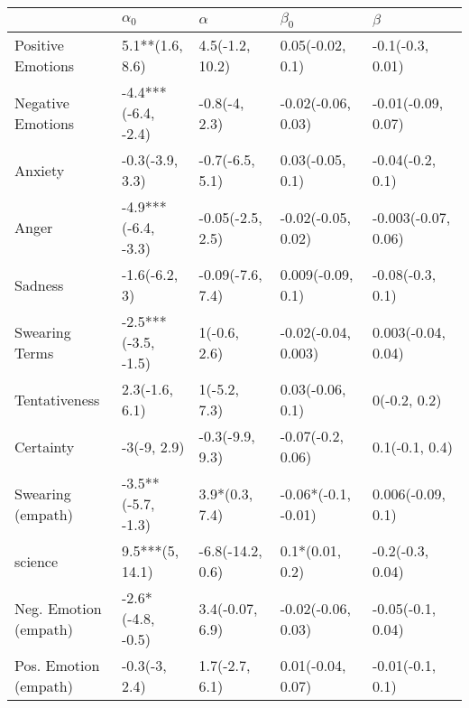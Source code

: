 \begin{tabular}{lllll}
\toprule
{} &           $\alpha_0$ &          $\alpha$ &            $\beta_0$ &              $\beta$ \\
\midrule
Positive Emotions     &      5.1**(1.6, 8.6) &   4.5(-1.2, 10.2) &     0.05(-0.02, 0.1) &     -0.1(-0.3, 0.01) \\
Negative Emotions     &  -4.4***(-6.4, -2.4) &     -0.8(-4, 2.3) &   -0.02(-0.06, 0.03) &   -0.01(-0.09, 0.07) \\
Anxiety               &      -0.3(-3.9, 3.3) &   -0.7(-6.5, 5.1) &     0.03(-0.05, 0.1) &     -0.04(-0.2, 0.1) \\
Anger                 &  -4.9***(-6.4, -3.3) &  -0.05(-2.5, 2.5) &   -0.02(-0.05, 0.02) &  -0.003(-0.07, 0.06) \\
Sadness               &        -1.6(-6.2, 3) &  -0.09(-7.6, 7.4) &    0.009(-0.09, 0.1) &     -0.08(-0.3, 0.1) \\
Swearing Terms        &  -2.5***(-3.5, -1.5) &      1(-0.6, 2.6) &  -0.02(-0.04, 0.003) &   0.003(-0.04, 0.04) \\
Tentativeness         &       2.3(-1.6, 6.1) &      1(-5.2, 7.3) &     0.03(-0.06, 0.1) &         0(-0.2, 0.2) \\
Certainty             &          -3(-9, 2.9) &   -0.3(-9.9, 9.3) &    -0.07(-0.2, 0.06) &       0.1(-0.1, 0.4) \\
Swearing (empath)     &   -3.5**(-5.7, -1.3) &    3.9*(0.3, 7.4) &  -0.06*(-0.1, -0.01) &    0.006(-0.09, 0.1) \\
science               &      9.5***(5, 14.1) &  -6.8(-14.2, 0.6) &      0.1*(0.01, 0.2) &     -0.2(-0.3, 0.04) \\
Neg. Emotion (empath) &    -2.6*(-4.8, -0.5) &   3.4(-0.07, 6.9) &   -0.02(-0.06, 0.03) &    -0.05(-0.1, 0.04) \\
Pos. Emotion (empath) &        -0.3(-3, 2.4) &    1.7(-2.7, 6.1) &    0.01(-0.04, 0.07) &     -0.01(-0.1, 0.1) \\
\bottomrule
\end{tabular}
